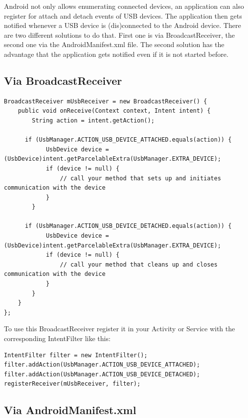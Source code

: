 Android not only allows enumerating connected devices, an application can also register for attach and detach events of USB devices. The application then gets notified whenever a USB device is (dis)connected to the Android device. There are two different solutions to do that. First one is via BroadcastReceiver, the second one via the AndroidManifest.xml file. The second solution has the advantage that the application gets notified even if it is not started before.

\subsection{Via BroadcastReceiver}

\begin{lstlisting}[caption=Attach and detach notification of USB devices via BroadcastReceivers, label=listing:attach_broadcast]
BroadcastReceiver mUsbReceiver = new BroadcastReceiver() {
    public void onReceive(Context context, Intent intent) {
        String action = intent.getAction(); 

      if (UsbManager.ACTION_USB_DEVICE_ATTACHED.equals(action)) {
            UsbDevice device = (UsbDevice)intent.getParcelableExtra(UsbManager.EXTRA_DEVICE);
            if (device != null) {
                // call your method that sets up and initiates communication with the device
            }
        }

      if (UsbManager.ACTION_USB_DEVICE_DETACHED.equals(action)) {
            UsbDevice device = (UsbDevice)intent.getParcelableExtra(UsbManager.EXTRA_DEVICE);
            if (device != null) {
                // call your method that cleans up and closes communication with the device
            }
        }
    }
};
\end{lstlisting}

To use this BroadcastReceiver register it in your Activity or Service with the corresponding IntentFilter like this:

\begin{lstlisting}[caption=Register the BroadcastReceiver with the desired actions, label=listing:attach_register]
IntentFilter filter = new IntentFilter();
filter.addAction(UsbManager.ACTION_USB_DEVICE_ATTACHED);
filter.addAction(UsbManager.ACTION_USB_DEVICE_DETACHED);
registerReceiver(mUsbReceiver, filter);
\end{lstlisting}

\subsection{Via AndroidManifest.xml}

